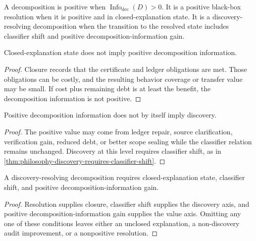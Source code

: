 \begin{definition}
\label{def:philosophy-positive-discovery-resolving-decompositions}
A decomposition is positive when
$\operatorname{Info}_{\mathrm{dec}}(D)>0$. It is a positive black-box
resolution when it is positive and in closed-explanation state. It is a
discovery-resolving decomposition when the transition to the resolved
state includes classifier shift and positive decomposition-information
gain.
\end{definition}

\begin{theorem}
\label{thm:philosophy-closure-does-not-imply-positive-value}
Closed-explanation state does not imply positive decomposition
information.
\end{theorem}
\begin{proof}
Closure records that the certificate and ledger obligations are met.
Those obligations can be costly, and the resulting behavior coverage or
transfer value may be small. If cost plus remaining debt is at least the
benefit, the decomposition information is not positive.
\end{proof}

\begin{theorem}
\label{thm:philosophy-positive-decomposition-not-automatically-discovery}
Positive decomposition information does not by itself imply discovery.
\end{theorem}
\begin{proof}
The positive value may come from ledger repair, source clarification,
verification gain, reduced debt, or better scope sealing while the
classifier relation remains unchanged. Discovery at this level requires
classifier shift, as in
\autoref{thm:philosophy-discovery-requires-classifier-shift}.
\end{proof}

\begin{theorem}
\label{thm:philosophy-discovery-resolution-requires-three-conditions}
A discovery-resolving decomposition requires closed-explanation state,
classifier shift, and positive decomposition-information gain.
\end{theorem}
\begin{proof}
Resolution supplies closure, classifier shift supplies the discovery
axis, and positive decomposition-information gain supplies the value
axis. Omitting any one of these conditions leaves either an unclosed
explanation, a non-discovery audit improvement, or a nonpositive
resolution.
\end{proof}


